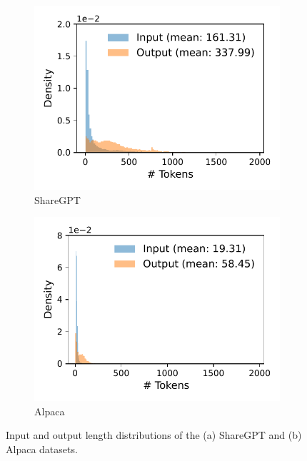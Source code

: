 \documentclass[sigplan,10pt]{acmart}
\begin{document}
\begin{figure}[t]
     \centering
     \begin{subfigure}[b]{0.5\linewidth}
         \centering
         \includegraphics[width=1\columnwidth]{figures/experiments/sharegpt_hist.pdf}
         \vskip -0.1in
         \caption{\small ShareGPT}
     \end{subfigure}%
     \begin{subfigure}[b]{0.5\linewidth}
         \centering
         \includegraphics[width=1\columnwidth]{figures/experiments/alpaca_hist.pdf}
         \vskip -0.1in
         \caption{\small Alpaca}
     \end{subfigure}%
     \vskip -0.1in
     \caption{Input and output length distributions of the (a) ShareGPT and (b) Alpaca datasets.}     
     \vspace{-10pt}
\label{fig:dataset-length-dist}
\end{figure}
\end{document}
